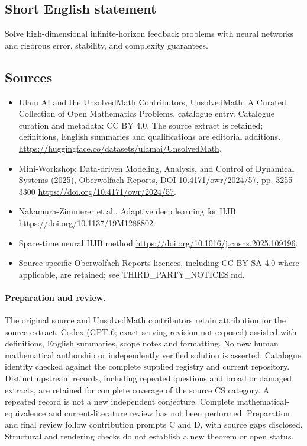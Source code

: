 \documentclass[11pt]{article}
\begin{document}
\subsection{Short English statement}
Solve high-dimensional infinite-horizon feedback problems with neural networks and rigorous error, stability, and complexity guarantees.
\subsection{Sources}
\begin{itemize}
\item[\hypertarget{source:statement:1}{S1}] Ulam AI and the UnsolvedMath Contributors, UnsolvedMath: A Curated Collection of Open Mathematics Problems, catalogue entry. Catalogue curation and metadata: CC BY 4.0. The source extract is retained; definitions, English summaries and qualifications are editorial additions.
\url{https://huggingface.co/datasets/ulamai/UnsolvedMath}.
\item[\hypertarget{source:statement:2}{S2}] Mini-Workshop: Data-driven Modeling, Analysis, and Control of Dynamical Systems (2025), Oberwolfach Reports, DOI 10.4171/owr/2024/57, pp. 3255--3300
\url{https://doi.org/10.4171/owr/2024/57}.
\item[\hypertarget{source:statement:3}{S3}] Nakamura-Zimmerer et al., Adaptive deep learning for HJB
\url{https://doi.org/10.1137/19M1288802}.
\item[\hypertarget{source:statement:4}{S4}] Space-time neural HJB method
\url{https://doi.org/10.1016/j.cnsns.2025.109196}.
\item Source-specific Oberwolfach Reports licences, including CC BY-SA 4.0 where applicable, are retained; see THIRD\_PARTY\_NOTICES.md.
\end{itemize}
\paragraph{Preparation and review.}
The original source and UnsolvedMath contributors retain attribution for the source extract. Codex (GPT-6; exact serving revision not exposed) assisted with definitions, English summaries, scope notes and formatting. No new human mathematical authorship or independently verified solution is asserted. Catalogue identity checked against the complete supplied registry and current repository. Distinct upstream records, including repeated questions and broad or damaged extracts, are retained for complete coverage of the source CS category. A repeated record is not a new independent conjecture. Complete mathematical-equivalence and current-literature review has not been performed. Preparation and final review follow contribution prompts C and D, with source gaps disclosed. Structural and rendering checks do not establish a new theorem or open status.
\label{end:statement}
\end{document}

